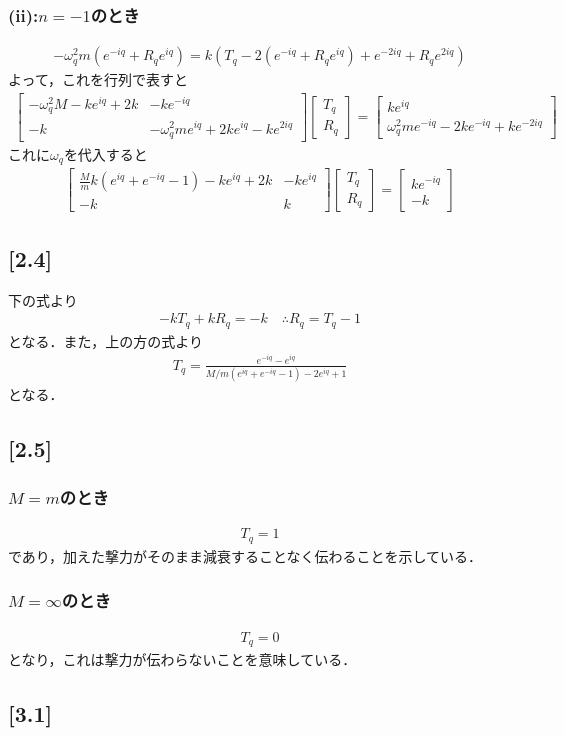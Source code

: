 \documentclass[12pt,dvipdfmx]{jsarticle}
\begin{document}
\subsubsection*{(ii):$n=-1$のとき}
\begin{eqnarray}
  -\omega_q^2m \left( e^{-iq} + R_q e^{iq} \right) = k\left( T_q-2 \left( e^{-iq} + R_q e^{iq} \right) + e^{-2iq} + R_q e^{2iq} \right)
\end{eqnarray}
よって，これを行列で表すと
\begin{eqnarray}
  \begin{bmatrix}
    -\omega_q^2M -ke^{iq}+2k & -ke^{-iq} \\
    -k & -\omega_q^2 m e^{iq} + 2ke^{iq}-k e^{2iq}
  \end{bmatrix}
  \begin{bmatrix}
    T_q \\
    R_q
  \end{bmatrix}
  =
  \begin{bmatrix}
    ke^{iq} \\
    \omega_q^2 m e^{-iq} -2ke^{-iq}+k e^{-2iq}
  \end{bmatrix}
\end{eqnarray}
これに$\omega_q$を代入すると
\begin{eqnarray}
  \begin{bmatrix}
    \frac{M}{m}k(e^{iq}+e^{-iq}-1)-ke^{iq}+2k & -ke^{iq}\\
    -k & k 
  \end{bmatrix}
  \begin{bmatrix}
    T_q \\
    R_q
  \end{bmatrix} =
  \begin{bmatrix}
    ke^{-iq} \\
    -k
  \end{bmatrix}
\end{eqnarray}
\subsection*{\large{[2.4]}}
下の式より
\begin{eqnarray}
  -k T_q + kR_q = -k \quad\therefore R_q = T_q-1
\end{eqnarray}
となる．また，上の方の式より
\begin{eqnarray}
  T_q = \frac{e^{-iq}-e^{iq}}{M/m(e^{iq}+e^{-iq}-1)-2e^{iq}+1}
\end{eqnarray}
となる．
\subsection*{\large{[2.5]}}
\subsubsection*{$M=m$のとき}
\begin{eqnarray}
  T_q =1
\end{eqnarray}
であり，加えた撃力がそのまま減衰することなく伝わることを示している．
\subsubsection*{$M=\infty$のとき}
\begin{eqnarray}
  T_q =0
\end{eqnarray}
となり，これは撃力が伝わらないことを意味している．

\subsection*{\large{[3.1]}}
\end{document}
